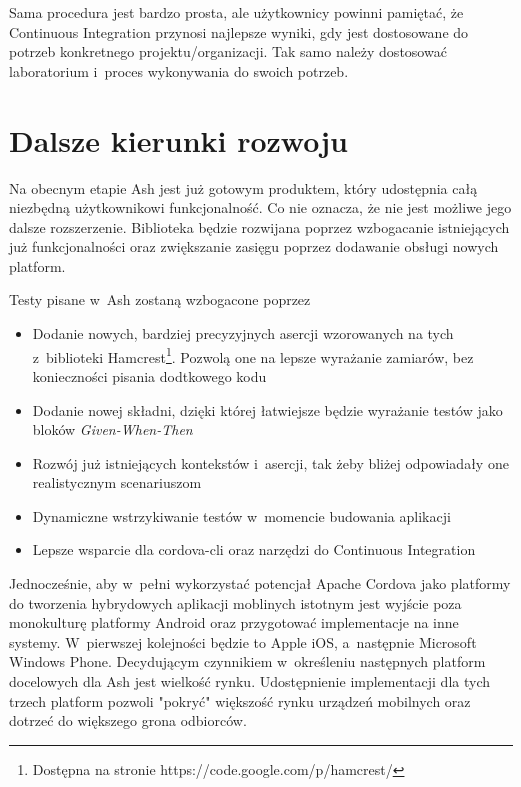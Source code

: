 \documentclass[brudnopis]{xmgr}
\begin{document}
Sama procedura jest bardzo prosta, ale użytkownicy powinni pamiętać, że Continuous Integration przynosi najlepsze wyniki, gdy jest dostosowane do potrzeb konkretnego projektu/organizacji. Tak samo należy dostosować laboratorium i~proces wykonywania do swoich potrzeb. 

\chapter{Dalsze kierunki rozwoju}

Na obecnym etapie Ash jest już gotowym produktem, który udostępnia całą niezbędną użytkownikowi funkcjonalność. Co nie oznacza, że nie jest możliwe jego dalsze rozszerzenie. Biblioteka będzie rozwijana poprzez wzbogacanie istniejących już funkcjonalności oraz zwiększanie zasięgu poprzez dodawanie obsługi nowych platform. 

Testy pisane w~Ash zostaną wzbogacone poprzez

\begin{itemize}
  \item Dodanie nowych, bardziej precyzyjnych asercji wzorowanych na tych z~biblioteki Hamcrest\footnote{Dostępna na stronie https://code.google.com/p/hamcrest/}. Pozwolą one na lepsze wyrażanie zamiarów, bez konieczności pisania dodtkowego kodu
  \item Dodanie nowej składni, dzięki której łatwiejsze będzie wyrażanie testów jako bloków \textit{Given-When-Then}
  \item Rozwój już istniejących kontekstów i~asercji, tak żeby bliżej odpowiadały one realistycznym scenariuszom 
  \item Dynamiczne wstrzykiwanie testów w~momencie budowania aplikacji
  \item Lepsze wsparcie dla cordova-cli oraz narzędzi do Continuous Integration
\end{itemize}

Jednocześnie, aby w~pełni wykorzystać potencjał Apache Cordova jako platformy do tworzenia hybrydowych aplikacji moblinych istotnym jest wyjście poza monokulturę platformy Android oraz przygotować implementacje na inne systemy. W~pierwszej kolejności będzie to Apple iOS, a~następnie Microsoft Windows Phone. Decydującym czynnikiem w~określeniu następnych platform docelowych dla Ash jest wielkość rynku. Udostępnienie implementacji dla tych trzech platform pozwoli "pokryć" większość rynku urządzeń mobilnych oraz dotrzeć do większego grona odbiorców. 

\summary
\end{document}
